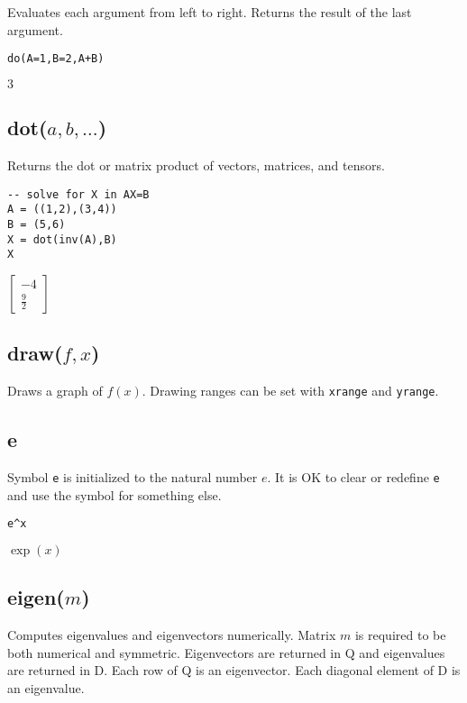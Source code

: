 Evaluates each argument from left to right.
Returns the result of the last argument.

{\color{blue}
\begin{verbatim}
do(A=1,B=2,A+B)
\end{verbatim}
}

\noindent
$3$

\subsection*{dot($a,b,\ldots$)}

Returns the dot or matrix product of vectors, matrices, and tensors.

{\color{blue}
\begin{verbatim}
-- solve for X in AX=B
A = ((1,2),(3,4))
B = (5,6)
X = dot(inv(A),B)
X
\end{verbatim}
}

\noindent
$\displaystyle \begin{bmatrix}-4\\ \tfrac{9}{2}\end{bmatrix}$

\subsection*{draw($f,x$)}

Draws a graph of $f(x)$.
Drawing ranges can be set with {\tt xrange} and {\tt yrange}.

\subsection*{e}

Symbol {\tt e} is initialized to the natural number $e$.
It is OK to clear or redefine {\tt e} and use the symbol for something else.

{\color{blue}
\begin{verbatim}
e^x
\end{verbatim}
}

\noindent
$\exp(x)$

\subsection*{eigen($m$)}

Computes eigenvalues and eigenvectors numerically.
Matrix $m$ is required to be both numerical and symmetric.
Eigenvectors are returned in Q and eigenvalues are returned in D.
Each row of Q is an eigenvector.
Each diagonal element of D is an eigenvalue.

